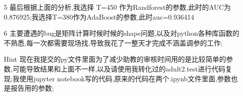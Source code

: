 \documentclass[11pt, a4paper, UTF8]{ctexart}
\begin{document}
\begin{solution}
\begin{enumerate}
\begin{enumerate}
\begin{itemize}
\begin{figure}[!htbp]
	\end{figure}
\end{itemize}
\item [5] 最后根据上面的分析,我选择 T=450 作为Randforest的参数,此时的AUC为0.876925;我选择T=380作为AdaBoost的参数,此时auc=0.936414
\item [6] 主要遭遇的bug是矩阵计算时候时候的shape问题,以及对python各种库函数的不熟悉,每一次都需要现场找,导致我花了一整天才完成不涵盖调参的工作;
\item [Hint] 现在我提交的py文件里面为了减少助教的审核时间用的是比较简单的参数,可能导致结果和上面不一样,以及请使用我转化过的adult2.test进行代码复现;我使用jupyter notebook写的代码,原来的代码在两个.ipynb文件里面,参数也是报告用的参数;
\end{enumerate}
\end{enumerate}
\end{solution}






   





	
    


%


\end{document}
